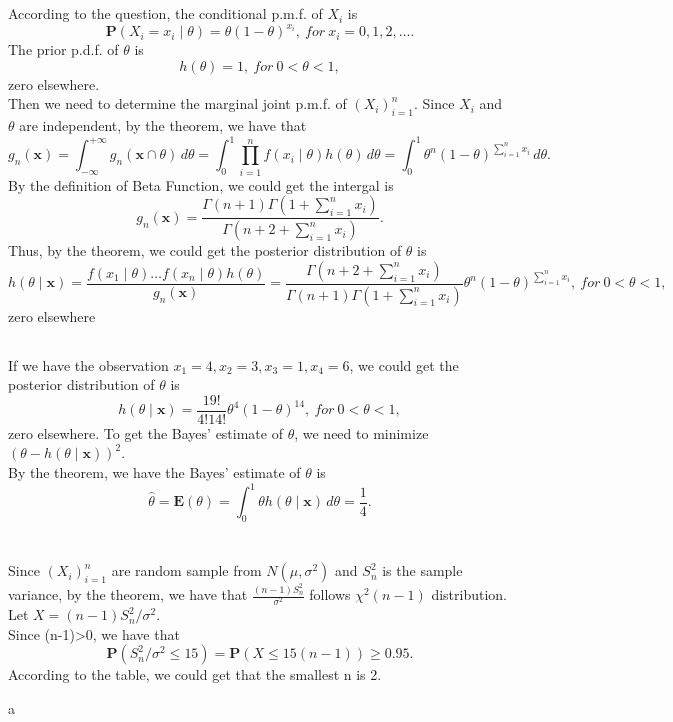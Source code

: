 \documentclass[10.5pt]{article}
\begin{document}
\section{}
\subsection{}
According to the question, the conditional p.m.f. of $X_i$ is $$\mathbf{P}(X_i=x_i\mid\theta)=\theta(1-\theta)^{x_i},~for ~x_i=0,1,2,\dots.$$\indent
The prior p.d.f. of $\theta$ is $$h(\theta)=1,~for ~0<\theta<1,$$\indent
zero elsewhere.\\\indent
Then we need to determine the marginal joint p.m.f. of $(X_i)_{i=1}^n$. Since $X_i$ and $\theta$ are independent, by the theorem, we have that $$g_n(\mathbf{x})=\int_{-\infty}^{+\infty}g_n(\mathbf{x}\cap \theta)\,d\theta=\int_0^1\prod_{i=1}^nf(x_i\mid\theta)h(\theta)\,d\theta=\int_0^1\theta^n(1-\theta)^{\sum_{i=1}^nx_i}\,d\theta.$$\indent
By the definition of Beta Function, we could get the intergal is $$g_n(\mathbf{x})=\frac{\Gamma(n+1)\Gamma(1+\sum_{i=1}^nx_i)}{\Gamma(n+2+\sum_{i=1}^nx_i)}.$$\indent
Thus, by the theorem, we could get the posterior distribution of $\theta$ is $$h(\theta\mid \mathbf{x})=\frac{f(x_1\mid\theta)\dots f(x_n\mid\theta)h(\theta)}{g_n(\mathbf{x})}=\frac{\Gamma(n+2+\sum_{i=1}^nx_i)}{\Gamma(n+1)\Gamma(1+\sum_{i=1}^nx_i)}\theta^n(1-\theta)^{\sum_{i=1}^nx_i},~for ~0<\theta<1,$$\indent
zero elsewhere
\subsection{}
If we have the observation $x_1=4,x_2=3,x_3=1,x_4=6$, we could get the posterior distribution of $\theta$ is $$h(\theta\mid\mathbf{x})=\frac{19!}{4!14!}\theta^4(1-\theta)^{14},~for ~0<\theta<1,$$\indent
zero elsewhere. To get the Bayes' estimate of $\theta$, we need to minimize $(\theta-h(\theta\mid\mathbf{x}))^2$.\\\indent
By the theorem, we have the Bayes' estimate of $\theta$ is $$\hat{\theta}=\mathbf{E}(\theta)=\int_0^1\theta h(\theta\mid\mathbf{x})\,d\theta=\frac{1}{4}.$$

\section{}
Since $(X_i)_{i=1}^n$ are random sample from $N(\mu,\sigma^2)$ and $S_n^2$ is the sample variance, by the theorem, we have that $\frac{(n-1)S_n^2}{\sigma^2}$ follows $\chi^2(n-1)$ distribution. Let $X=(n-1)S_n^2/\sigma^2$.\\\indent
Since (n-1)>0, we have that $$\mathbf{P}(S_n^2/\sigma^2\leqslant 15)=\mathbf{P}(X\leqslant 15(n-1))\geqslant 0.95.$$\indent
According to the table, we could get that the smallest n is 2.

\newpage
a
\end{document}
